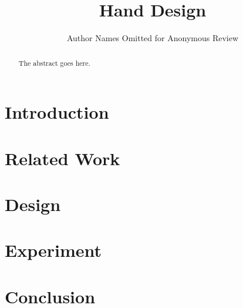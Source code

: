 \documentclass[conference]{IEEEtran}
\title{Hand Design}
\author{Author Names Omitted for Anonymous Review}
\begin{document}
\maketitle
\begin{abstract}
The abstract goes here.
\end{abstract}

\section{Introduction}
\label{sec:introduction}

\section{Related Work}
\label{sec:related_work}

\section{Design}
\label{sec:design}

\section{Experiment}
\label{sec:experiment}

\section{Conclusion}
\label{sec:conclusion}


\maketitle



% 
\end{document}
